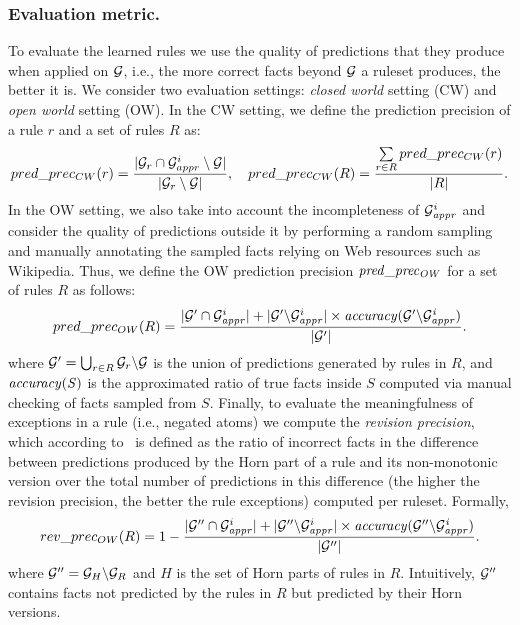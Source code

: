 \subsubsection{Evaluation metric.} 
To evaluate the learned rules we use the quality of predictions that they produce 
when applied on $\mathcal{G}$, i.e., the more correct facts beyond $\mathcal{G}$ a ruleset produces, the better it is.  
We consider two evaluation settings: \emph{closed world} setting (CW) and \emph{open world} setting (OW). 
In the CW setting, we define the prediction precision of a rule $r$ and a set of rules $R$ as:
\begin{align*}
  pred\_prec_{CW}(r) = \frac{|\mathcal{G}_r \cap \mathcal{G}^i_{appr} \setminus \mathcal{G}|}{|\mathcal{G}_r \setminus \mathcal{G}|},
  \quad 
  pred\_prec_{CW}(R) = \frac{\sum\limits_{r\in R} pred\_prec_{CW}(r)}{|R|}.
\end{align*}  
In the OW setting, we also take into account the incompleteness of $\mathcal{G}^i_{\mathit{appr}}$ and  
consider the quality of predictions outside it by performing a random sampling and manually annotating the sampled facts relying on Web resources such as Wikipedia. Thus, we define the OW prediction precision $\mathit{pred\_prec_{OW}}$ for a set of rules $R$ as follows:
\[
pred\_prec_{OW}(R) = \frac{|\mathcal{G}'\cap \mathcal{G}^i_{\mathit{appr}}|+|\mathcal{G}'\backslash \mathcal{G}^i_{\mathit{appr}}|\times \mathit{accuracy(\mathcal{G}'\backslash \mathcal{G}^i_{\mathit{appr}})}}{|\mathcal{G}'|}.
\]
where $\mathcal{G}'=\bigcup_{r\in R}\mathcal{G}_r\backslash \mathcal{G}$ is the union of predictions generated by rules in $R$, and $\mathit{accuracy(S)}$ is the approximated ratio of true facts inside $S$ computed via manual checking of facts sampled from $S$.
Finally, to evaluate the meaningfulness of exceptions in a rule (i.e., negated atoms) we compute the \textit{revision precision}, which according to~\cite{trantowards} is defined as the ratio of incorrect facts in the difference between predictions produced by the Horn part of a rule and its non-monotonic version over the total number of predictions in this difference (the higher the revision precision, the better the rule exceptions) computed per ruleset. Formally,
\begin{align*}
rev\_prec_{OW}(R) = 1-\frac{|\mathcal{G}'' \cap \mathcal{G}^i_{\mathit{appr}}|+|\mathcal{G}''\backslash \mathcal{G}^i_{\mathit{appr}}|\times \mathit{accuracy(\mathcal{G}''\backslash \mathcal{G}^i_{\mathit{appr}})}}{|\mathcal{G}''|}.
\end{align*}
where $\mathcal{G}''=\mathcal{G}_H\backslash \mathcal{G}_R$ and $H$ is the set of Horn parts of rules in $R$. 
Intuitively, $\mathcal{G}''$ contains facts not predicted by the rules in $R$ but predicted by their Horn versions. 
 

